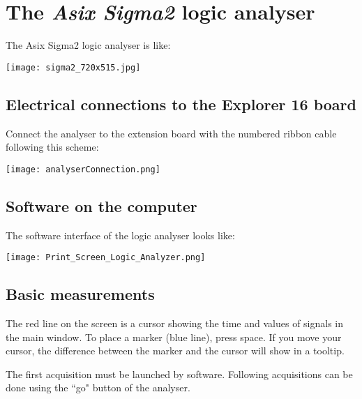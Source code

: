\appendix

\section{The \textit{Asix Sigma2} logic analyser}
\label{ap:la}

The Asix Sigma2 logic analyser is like:\\ 
\begin{center}
    \texttt{[image: sigma2\_720x515.jpg]}
\end{center}

\subsection{Electrical connections to the Explorer 16 board}
    Connect the analyser to the extension board with the numbered ribbon cable following this scheme:
    \begin{center}
        \texttt{[image: analyserConnection.png]}
    \end{center}

\subsection{Software on the computer}
    The software interface of the logic analyser looks like:
    \begin{center}
    \texttt{[image: Print\_Screen\_Logic\_Analyzer.png]}
    \end{center}

\subsection{Basic measurements}
    The red line on the screen is a cursor showing the time and values of signals in the main window. To place a marker (blue line), press space. If you move your cursor, the difference between the marker and the cursor will show in a tooltip.

    The first acquisition must be launched by software. Following acquisitions can be done using the ``go" button of the analyser.
